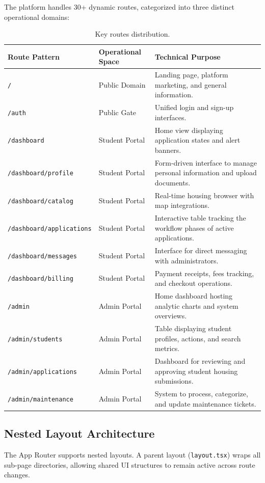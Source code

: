 \documentclass[12pt,a4paper]{article}
\begin{document}
The platform handles 30+ dynamic routes, categorized into three distinct operational domains:

\begin{table}[H]
\centering
\small
\begin{tabular}{@{}lll@{}}
\toprule
\textbf{Route Pattern} & \textbf{Operational Space} & \textbf{Technical Purpose} \\
\midrule
\texttt{/} & Public Domain & Landing page, platform marketing, and general information. \\
\texttt{/auth} & Public Gate & Unified login and sign-up interfaces. \\
\texttt{/dashboard} & Student Portal & Home view displaying application states and alert banners. \\
\texttt{/dashboard/profile} & Student Portal & Form-driven interface to manage personal information and upload documents. \\
\texttt{/dashboard/catalog} & Student Portal & Real-time housing browser with map integrations. \\
\texttt{/dashboard/applications} & Student Portal & Interactive table tracking the workflow phases of active applications. \\
\texttt{/dashboard/messages} & Student Portal & Interface for direct messaging with administrators. \\
\texttt{/dashboard/billing} & Student Portal & Payment receipts, fees tracking, and checkout operations. \\
\texttt{/admin} & Admin Portal & Home dashboard hosting analytic charts and system overviews. \\
\texttt{/admin/students} & Admin Portal & Table displaying student profiles, actions, and search metrics. \\
\texttt{/admin/applications} & Admin Portal & Dashboard for reviewing and approving student housing submissions. \\
\texttt{/admin/maintenance} & Admin Portal & System to process, categorize, and update maintenance tickets. \\
\bottomrule
\end{tabular}
\caption{Key routes distribution.}
\end{table}

\subsection{Nested Layout Architecture}

The App Router supports nested layouts. A parent layout (\texttt{layout.tsx}) wraps all sub-page directories, allowing shared UI structures to remain active across route changes.
\end{document}

